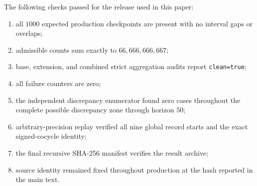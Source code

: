 \documentclass[11pt]{article}
\theoremstyle{definition}
\theoremstyle{remark}
\begin{document}
The following checks passed for the release used in this paper:
\begin{enumerate}[leftmargin=2.2em]
\item all $1000$ expected production checkpoints are present with no interval gaps or overlaps;
\item admissible counts sum exactly to $66{,}666{,}666{,}667$;
\item base, extension, and combined strict aggregation audits report \texttt{clean=true};
\item all failure counters are zero;
\item the independent discrepancy enumerator found zero cases throughout the complete possible discrepancy zone through horizon $50$;
\item arbitrary-precision replay verified all nine global record starts and the exact signed-cocycle identity;
\item the final recursive SHA-256 manifest verifies the result archive;
\item source identity remained fixed throughout production at the hash reported in the main text.
\end{enumerate}
\end{document}
